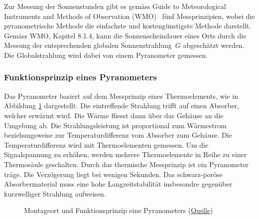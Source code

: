 \noindent
Zur Messung der Sonnenstunden gibt es gemäss \flqq Guide to Meteorological Instruments and Methods of Observation (WMO)\frqq ~\cite{WMO2014Gtmi} fünf Messprinzipien, wobei die pyranometrische Methode die einfachste und kostengünstigste Methode darstellt. Gemäss WMO, Kapitel 8.1.4, kann die Sonnenscheindauer eines Orts durch die Messung der entsprechenden globalen Sonnenstrahlung\ $G$ abgeschätzt werden. Die Globalstrahlung wird dabei von einem Pyranometer gemessen.


\subsubsection{Funktionsprinzip eines Pyranometers}
Das Pyranometer basiert auf dem Messprinzip eines Thermoelements, wie in Abbildung \ref{img:pyranometer}  dargestellt. Die eintreffende Strahlung trifft auf einen Absorber, welcher erwärmt wird. Die Wärme fliesst dann über das Gehäuse an die Umgebung ab. Die Strahlungsleistung ist proportional zum Wärmestrom beziehungsweise zur Temperaturdifferenz vom Absorber zum Gehäuse. Die Temperaturdifferenz wird mit Thermoelementen gemessen. Um die Signalspannung zu erhöhen, werden mehrere Thermoelemente in Reihe zu einer Thermosäule geschalten. Durch das thermische Messprinzip ist ein Pyranometer träge. Die Verzögerung liegt bei wenigen Sekunden. Das schwarz-poröse Absorbermaterial muss eine hohe Langzeitstabilität insbesondre gegenüber kurzwelliger Strahlung aufweisen.

\begin{figure}[htbp]
	\centering
	\caption{Montageort und Funktionsprinzip eine Pyranometers (\href{http://www.kippzonen.com/News/572/The-Working-Principle-of-a-Thermopile-Pyranometer}{Quelle})}
	\label{img:pyranometer}
\end{figure}


